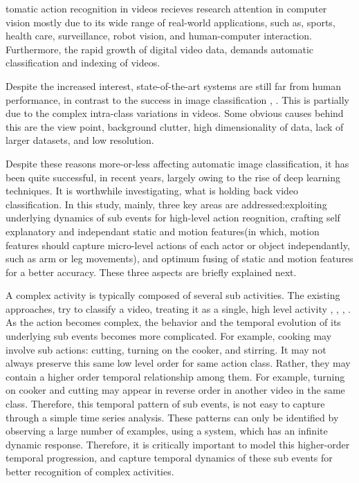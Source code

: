 
tomatic action recognition in videos recieves research attention  
in computer vision mostly due to its wide range of real-world applications, such as, 
sports, health care, surveillance, robot vision, and human-computer interaction.
Furthermore, the rapid growth of digital video data, demands automatic
classification and indexing of videos. 





Despite the increased interest, state-of-the-art
systems are still far from human performance, in contrast to the success in image classification \cite{girshick2014rich},
 \cite{krizhevsky2012imagenet}. This is partially due to the complex intra-class variations in videos. Some
obvious causes behind this are the view point, background 
clutter, high dimensionality of data, lack of larger datasets, and low resolution. 

Despite these reasons more-or-less affecting automatic image classification, it has been quite successful, in recent years,
largely owing to the rise of deep learning techniques. It is worthwhile investigating,
what is holding back video classification. In this study, mainly, three key
areas are addressed:exploiting underlying dynamics of sub events for high-level action reognition, crafting 
self explanatory and independant static and motion features(in which, motion features should capture micro-level actions
of each actor or object independantly, such as arm or leg movements), and optimum fusing of static and motion features for a better accuracy. 
These three aspects are briefly explained next.

A complex activity is typically composed of several sub activities. 
The existing approaches, try to classify a video, treating it as a 
single, high level activity \cite{wang2011action}, \cite{wang2013action}, \cite{simonyan2014two}, 
\cite{7486474}.
As the action becomes complex, the behavior and the 
temporal evolution of its underlying sub events becomes more complicated. For example,
cooking may involve sub actions: cutting, turning on the cooker, and stirring. It may not always preserve this 
same low level order for same action class. Rather, they may contain 
a higher order temporal relationship among them. For example, turning on cooker and cutting
may appear in reverse order in another video in the same class. 
Therefore, this temporal pattern of sub events, is not easy to capture through a simple
time series analysis. These patterns can only be identified by observing a large number
of examples, using a system, which has an infinite dynamic response. Therefore, it is critically important to
model this higher-order temporal
progression, and capture temporal dynamics of these sub events for better recognition of
complex activities. 


